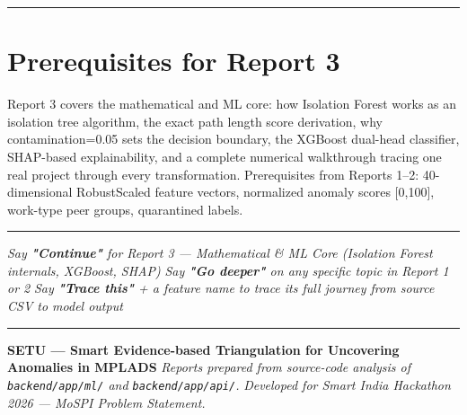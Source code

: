 \documentclass[11pt,a4paper]{article}
\begin{document}
\vspace{1em}\hrule\vspace{1em}

\section{Prerequisites for Report 3}

Report 3 covers the mathematical and ML core: how Isolation Forest works as an isolation tree algorithm, the exact path length score derivation, why contamination=0.05 sets the decision boundary, the XGBoost dual-head classifier, SHAP-based explainability, and a complete numerical walkthrough tracing one real project through every transformation. Prerequisites from Reports 1–2: 40-dimensional RobustScaled feature vectors, normalized anomaly scores [0,100], work-type peer groups, quarantined labels.

\vspace{1em}\hrule\vspace{1em}

\textit{Say \textbf{"Continue"} for Report 3 --- Mathematical \& ML Core (Isolation Forest internals, XGBoost, SHAP)}
\textit{Say \textbf{"Go deeper"} on any specific topic in Report 1 or 2}
\textit{Say \textbf{"Trace this"} + a feature name to trace its full journey from source CSV to model output}

\vspace{1em}\hrule\vspace{1em}

\textbf{SETU --- Smart Evidence-based Triangulation for Uncovering Anomalies in MPLADS}
\textit{Reports prepared from source-code analysis of \texttt{backend/app/ml/} and \texttt{backend/app/api/}.}
\textit{Developed for Smart India Hackathon 2026 --- MoSPI Problem Statement.}
\end{document}
